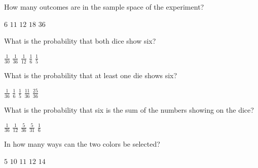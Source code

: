 \documentclass[answers,12pt]{exam}
\begin{document}
\begin{questions}
\question\label{FirstDice}
How many outcomes are in the sample space of the experiment?\\
\begin{oneparchoices}
\choice $6$ %
\choice $11$ %
\choice $12$ %
\choice $18$
\correctchoice $36$
\end{oneparchoices}

\question What is the probability that both dice show six?\\
\begin{oneparchoices}
\choice $\frac{1}{30}$ %
\correctchoice $\frac{1}{36}$
\choice $\frac{1}{12}$ %
\choice $\frac{1}{6}$
\choice $\frac{1}{5}$ %
\end{oneparchoices}

\question
What is the probability that at least one die shows six?\\
\begin{oneparchoices}
\choice $\frac{1}{36}$
\choice $\frac{1}{6}$
\choice $\frac{1}{5}$ %
\correctchoice $\frac{11}{36}$
\choice $\frac{25}{36}$ %
\end{oneparchoices}

\question\label{LastDice}
What is the probability that six is the sum of the numbers
showing on the dice?\\
\begin{oneparchoices}
\choice $\frac{1}{36}$
\choice $\frac{1}{12}$ %
\correctchoice $\frac{5}{36}$
\choice $\frac{5}{31}$ %
\choice $\frac{1}{6}$
\end{oneparchoices}


\question\label{FirstColor}
In how many ways can the two colors be selected?\\
\begin{oneparchoices}
\choice $5$ %
\correctchoice $10$
\choice $11$ %
\choice $12$ %
\choice $14$ %
\end{oneparchoices}


\end{questions}
\end{document}

